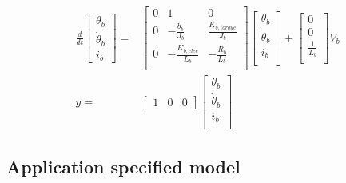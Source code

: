 \documentclass[../../main]{subfiles}
\begin{document}
\begin{equation}
      \label{eq:ss_bottomframe_Genereal_model}
      \begin{split}
      \frac{d}{dt}
    \begin{bmatrix}
        \theta_b \\
        \dot \theta_b \\
        i_b
    \end{bmatrix}
    =&
    \begin{bmatrix}
        0 & 1               & 0             \\
        0 & -\frac{b_b}{J_b}    & \frac{K_{b,torque}}{J_b} \\
        0 & -\frac{K_{b,elec}}{L_b}  & -\frac{R_b}{L_b}  \\
    \end{bmatrix}
    \begin{bmatrix}
        \theta_b \\
        \dot \theta_b \\
        i_b \\
    \end{bmatrix}
    +
    \begin{bmatrix}
        0 \\
        0 \\
        \frac{1}{L_b} \\
    \end{bmatrix}
    V_b
\\
      y =&
    \begin{bmatrix}
        1 & 0 & 0
    \end{bmatrix}
    \begin{bmatrix}
        \theta_b \\
        \dot \theta_b\\
        i_b\\
    \end{bmatrix}
  \end{split}
\end{equation}

\subsection{Application specified model}
\end{document}
